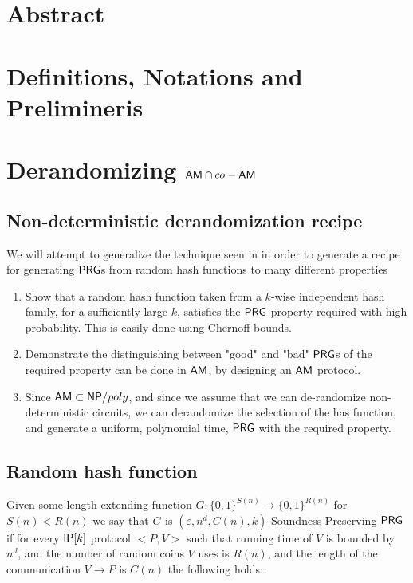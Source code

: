 \documentclass[11]{article}
\begin{document}

\section{Abstract}

\section{Definitions, Notations and Prelimineris}

\section{Derandomizing $\mathsf{AM} \cap co-\mathsf{AM}$}

\subsection{Non-deterministic derandomization recipe}

We will attempt to generalize the  technique seen in \cite{AASY16} in order to generate a recipe for generating $\mathsf{PRG}$s from random hash functions to many different properties 
\begin{enumerate}
    \item Show that a random hash function taken from a $k$-wise independent hash family, for a sufficiently large $k$, satisfies the $\mathsf{PRG}$ property required with high probability. This is easily done using Chernoff bounds.
    \item Demonstrate the distinguishing between "good" and "bad" $\mathsf{PRG}$s of the required property can be done in $\mathsf{AM}$, by designing an $\mathsf{AM}$ protocol.
    \item Since $\mathsf{AM} \subset \mathsf{NP}/poly$, and since we assume that we can de-randomize non-deterministic circuits, we can derandomize the selection of the has function, and generate a uniform, polynomial time, $\mathsf{PRG}$ with the required property.
\end{enumerate}

\subsection{Random hash function}


Given some length extending function $G:\{0,1\}^{S(n)} \to \{0,1\}^{R(n)}$ for $S(n) < R(n)$ we say that $G$ is $(\varepsilon, n^d, C(n),k)$-Soundness Preserving $\mathsf{PRG}$ if for every $\mathsf{IP}[k]$ protocol $<P,V>$ such that running time of $V$ is bounded by $n^d$, and the number of random coins $V$ uses is $R(n)$, and the length of the communication $V \to P$ is $C(n)$ the following holds:
\end{document}
